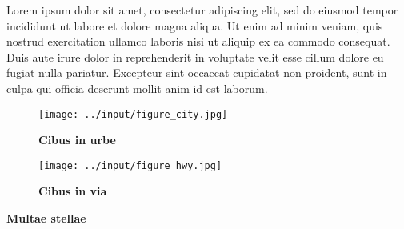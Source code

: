 \documentclass[12pt]{article}
\begin{document}
\begin{spacing}{1.4}
Lorem ipsum dolor sit amet, consectetur adipiscing elit, sed do eiusmod tempor incididunt ut labore et dolore magna aliqua. Ut enim ad minim veniam, quis nostrud exercitation ullamco laboris nisi ut aliquip ex ea commodo consequat. Duis aute irure dolor in reprehenderit in voluptate velit esse cillum dolore eu fugiat nulla pariatur. Excepteur sint occaecat cupidatat non proident, sunt in culpa qui officia deserunt mollit anim id est laborum.

\pagebreak{}



\pagebreak{}

\begin{figure}[!htp]
    \centering
    \caption{\bf{Cibus in urbe}}
    \label{fig:City}

    \texttt{[image: ../input/figure\_city.jpg]}

\end{figure}

\vspace{2cm}

\begin{figure}[!htp]
    \centering
    \caption{\bf{Cibus in via}}
    \label{fig:Hwy}

    \texttt{[image: ../input/figure\_hwy.jpg]}

\end{figure}

\pagebreak{}
\begin{table}[htp]
    \centering
    \caption{\bf{Multae stellae}}
    \label{tab:regression}
    
    
    
\end{table}



\end{spacing}
\end{document}
